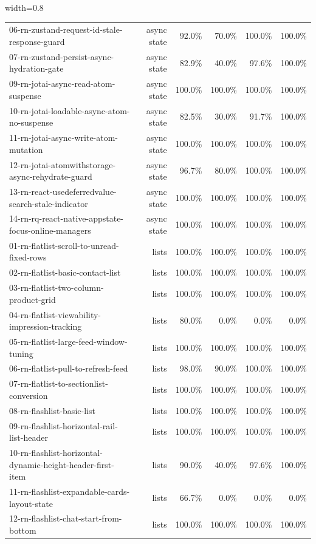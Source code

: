 \begin{table}[htbp]
\begin{adjustbox}{width=0.8\textwidth}
\begin{tabular}{lrrrrr}
06-rn-zustand-request-id-stale-response-guard & async state & 92.0\% & 70.0\% & 100.0\% & 100.0\% \\
07-rn-zustand-persist-async-hydration-gate & async state & 82.9\% & 40.0\% & 97.6\% & 100.0\% \\
09-rn-jotai-async-read-atom-suspense & async state & 100.0\% & 100.0\% & 100.0\% & 100.0\% \\
10-rn-jotai-loadable-async-atom-no-suspense & async state & 82.5\% & 30.0\% & 91.7\% & 100.0\% \\
11-rn-jotai-async-write-atom-mutation & async state & 100.0\% & 100.0\% & 100.0\% & 100.0\% \\
12-rn-jotai-atomwithstorage-async-rehydrate-guard & async state & 96.7\% & 80.0\% & 100.0\% & 100.0\% \\
13-rn-react-usedeferredvalue-search-stale-indicator & async state & 100.0\% & 100.0\% & 100.0\% & 100.0\% \\
14-rn-rq-react-native-appstate-focus-online-managers & async state & 100.0\% & 100.0\% & 100.0\% & 100.0\% \\
01-rn-flatlist-scroll-to-unread-fixed-rows & lists & 100.0\% & 100.0\% & 100.0\% & 100.0\% \\
02-rn-flatlist-basic-contact-list & lists & 100.0\% & 100.0\% & 100.0\% & 100.0\% \\
03-rn-flatlist-two-column-product-grid & lists & 100.0\% & 100.0\% & 100.0\% & 100.0\% \\
04-rn-flatlist-viewability-impression-tracking & lists & 80.0\% & 0.0\% & 0.0\% & 0.0\% \\
05-rn-flatlist-large-feed-window-tuning & lists & 100.0\% & 100.0\% & 100.0\% & 100.0\% \\
06-rn-flatlist-pull-to-refresh-feed & lists & 98.0\% & 90.0\% & 100.0\% & 100.0\% \\
07-rn-flatlist-to-sectionlist-conversion & lists & 100.0\% & 100.0\% & 100.0\% & 100.0\% \\
08-rn-flashlist-basic-list & lists & 100.0\% & 100.0\% & 100.0\% & 100.0\% \\
09-rn-flashlist-horizontal-rail-list-header & lists & 100.0\% & 100.0\% & 100.0\% & 100.0\% \\
10-rn-flashlist-horizontal-dynamic-height-header-first-item & lists & 90.0\% & 40.0\% & 97.6\% & 100.0\% \\
11-rn-flashlist-expandable-cards-layout-state & lists & 66.7\% & 0.0\% & 0.0\% & 0.0\% \\
12-rn-flashlist-chat-start-from-bottom & lists & 100.0\% & 100.0\% & 100.0\% & 100.0\% \\

\end{tabular}
\end{adjustbox}
\end{table}
